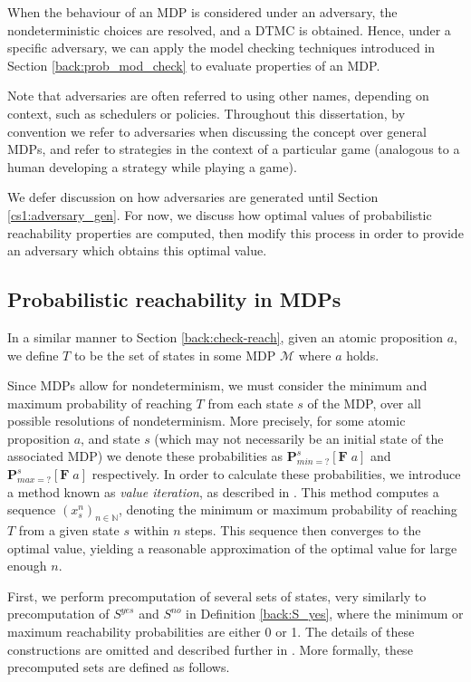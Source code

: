 When the behaviour of an MDP is considered under an adversary, the nondeterministic choices are resolved, and a DTMC is obtained. Hence, under a specific adversary, we can apply the model checking techniques introduced in Section \ref{back:prob_mod_check} to evaluate properties of an MDP.

Note that adversaries are often referred to using other names, depending on context, such as schedulers or policies. Throughout this dissertation, by convention we refer to adversaries when discussing the concept over general MDPs, and refer to strategies in the context of a particular game (analogous to a human developing a strategy while playing a game).

We defer discussion on how adversaries are generated until Section \ref{cs1:adversary_gen}. For now, we discuss how optimal values of probabilistic reachability properties are computed, then modify this process in order to provide an adversary which obtains this optimal value.

\subsection{Probabilistic reachability in MDPs}
\label{cs1:prob_reach_mdps}

In a similar manner to Section \ref{back:check-reach}, given an atomic proposition $a$, we define $T$ to be the set of states in some MDP $\mathcal{M}$ where $a$ holds.

Since MDPs allow for nondeterminism, we must consider the minimum and maximum probability of reaching $T$ from each state $s$ of the MDP, over all possible resolutions of nondeterminism. More precisely, for some atomic proposition $a$, and state $s$ (which may not necessarily be an initial state of the associated MDP) we denote these probabilities as $\mathbf{P}^{s}_{min=?} [\mathbf{F} \; a]$ and $\mathbf{P}^{s}_{max=?} [\mathbf{F} \; a]$ respectively. In order to calculate these probabilities, we introduce a method known as \emph{value iteration}, as described in \cite{chatterjee_value_2008}. This method computes a sequence $(x^n_s)_{n \in \mathbb{N}}$, denoting the minimum or maximum probability of reaching $T$ from a given state $s$ within $n$ steps. This sequence then converges to the optimal value, yielding a reasonable approximation of the optimal value for large enough $n$.

First, we perform precomputation of several sets of states, very similarly to precomputation of $S^{yes}$ and $S^{no}$ in Definition \ref{back:S_yes}, where the minimum or maximum reachability probabilities are either 0 or 1. The details of these constructions are omitted and described further in \cite{forejt_automated_2011}. More formally, these precomputed sets are defined as follows.

